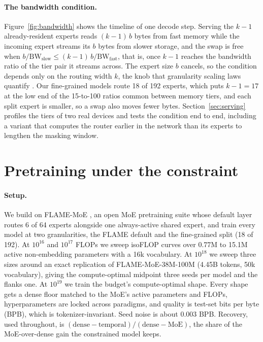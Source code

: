 \documentclass{article}
\begin{document}
\paragraph{The bandwidth condition.} Figure~\ref{fig:bandwidth} shows the timeline of one
decode step. Serving the $k-1$ already-resident experts reads $(k-1)\,b$ bytes from fast
memory while the incoming expert streams its $b$ bytes from slower storage, and the swap is
free when $b/\mathrm{BW}_{\mathrm{slow}}\le(k-1)\,b/\mathrm{BW}_{\mathrm{fast}}$, that is,
once $k-1$ reaches the bandwidth ratio of the tier pair it streams across. The expert size
$b$ cancels, so the condition depends only on the routing width $k$, the knob that
granularity scaling laws quantify
\citep{krajewski2024granularity,clark2022unified,ludziejewski2025joint}. Our fine-grained
models route 18 of 192 experts, which puts $k-1=17$ at the low end of the 15-to-100 ratios
common between memory tiers, and each split expert is smaller, so a swap also moves fewer
bytes. Section~\ref{sec:serving} profiles the tiers of two real devices and tests the
condition end to end, including a variant that computes the router earlier in the network
than its experts to lengthen the masking window.

\section{Pretraining under the constraint}\label{sec:pretraining}

\paragraph{Setup.} We build on FLAME-MoE \citep{kang2025flame}, an open MoE pretraining suite
whose default layer routes 6 of 64 experts alongside one always-active shared expert, and
train every model at two granularities, the FLAME default and the fine-grained split (18 of
192). At $10^{16}$ and $10^{17}$ FLOPs we sweep isoFLOP curves over 0.77M to 15.1M active
non-embedding parameters with a 16k vocabulary. At $10^{18}$ we sweep three sizes around an
exact replication of FLAME-MoE-38M-100M (4.45B tokens, 50k vocabulary), giving the
compute-optimal midpoint three seeds per model and the flanks one. At $10^{19}$ we train the
budget's compute-optimal shape. Every shape gets a dense floor matched to the MoE's active
parameters and FLOPs, hyperparameters are locked across paradigms, and quality is test-set
bits per byte (BPB), which is tokenizer-invariant. Seed noise is about 0.003 BPB. Recovery,
used throughout, is $(\text{dense}-\text{temporal})/(\text{dense}-\text{MoE})$, the share of
the MoE-over-dense gain the constrained model keeps.
\end{document}
